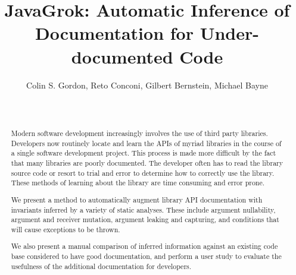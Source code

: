 \documentclass{acm_proc_article-sp}
\begin{document}
\lstset{
	language=Java,
	numbers=left,
	tabsize=2,
	showstringspaces=false,
	basicstyle=\ttfamily\tiny
}

\title{JavaGrok: Automatic Inference of Documentation for Under-documented Code}

\author{
\alignauthor
Colin S. Gordon, Reto Conconi, Gilbert Bernstein, Michael Bayne\\
       \\
       \\
}

\maketitle
\begin{abstract}
Modern software development increasingly involves the use of third party
libraries. Developers now routinely locate and learn the APIs of myriad
libraries in the course of a single software development project. This process
is made more difficult by the fact that many libraries are poorly documented.
The developer often has to read the library source code or resort to trial and
error to determine how to correctly use the library. These methods of learning
about the library are time consuming and error prone.

We present a method to automatically augment library API documentation with invariants
inferred by a variety of static analyses. These include argument nullability,
argument and receiver mutation, argument leaking and capturing, and conditions
that will cause exceptions to be thrown.

We also present a manual comparison of inferred information against an existing
code base considered to have good documentation, and perform a user study to
evaluate the usefulness of the additional documentation for developers.
\end{abstract}


\end{document}
